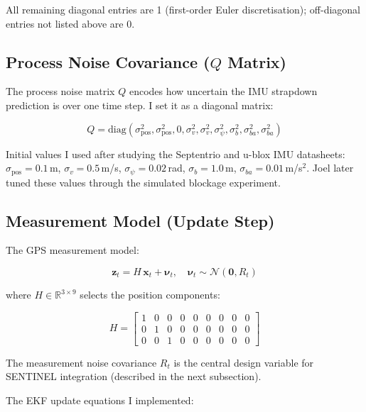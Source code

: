 \documentclass[12pt,a4paper]{article}
\begin{document}
All remaining diagonal entries are 1 (first-order Euler discretisation); off-diagonal
entries not listed above are 0.

\subsection{Process Noise Covariance ($Q$ Matrix)}

The process noise matrix $Q$ encodes how uncertain the IMU strapdown prediction is
over one time step.
I set it as a diagonal matrix:

\begin{equation}
  Q = \mathrm{diag}\left(\sigma_\mathrm{pos}^2, \sigma_\mathrm{pos}^2, 0,
    \sigma_v^2, \sigma_v^2, \sigma_\psi^2,
    \sigma_b^2, \sigma_{ba}^2, \sigma_{ba}^2\right)
\end{equation}

Initial values I used after studying the Septentrio and u-blox IMU datasheets:
$\sigma_\mathrm{pos} = 0.1$\,m, $\sigma_v = 0.5$\,m/s,
$\sigma_\psi = 0.02$\,rad, $\sigma_b = 1.0$\,m, $\sigma_{ba} = 0.01$\,m/s$^2$.
Joel later tuned these values through the simulated blockage experiment.

\subsection{Measurement Model (Update Step)}

The GPS measurement model:

\begin{equation}
  \mathbf{z}_t = H\,\mathbf{x}_t + \boldsymbol{\nu}_t,\quad
  \boldsymbol{\nu}_t \sim \mathcal{N}(\mathbf{0}, R_t)
\end{equation}

where $H \in \mathbb{R}^{3 \times 9}$ selects the position components:

\begin{equation}
  H = \begin{bmatrix}
    1 & 0 & 0 & 0 & 0 & 0 & 0 & 0 & 0 \\
    0 & 1 & 0 & 0 & 0 & 0 & 0 & 0 & 0 \\
    0 & 0 & 1 & 0 & 0 & 0 & 0 & 0 & 0
  \end{bmatrix}
\end{equation}

The measurement noise covariance $R_t$ is the central design variable for SENTINEL
integration (described in the next subsection).

The EKF update equations I implemented:
\end{document}

